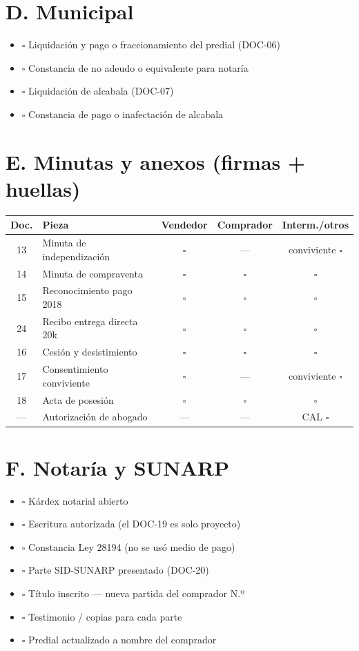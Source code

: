 \documentclass[12pt,a4paper]{article}
\begin{document}
\section*{D. Municipal}
\begin{itemize}[leftmargin=0.9cm]
\item $\square$ Liquidación y pago o fraccionamiento del predial (DOC-06)
\item $\square$ Constancia de no adeudo o equivalente para notaría
\item $\square$ Liquidación de alcabala (DOC-07)
\item $\square$ Constancia de pago o inafectación de alcabala
\end{itemize}

\section*{E. Minutas y anexos (firmas + huellas)}
{\small\renewcommand{\arraystretch}{1.18}
\noindent\begin{tabularx}{\textwidth}{c >{\raggedright\arraybackslash}p{6.8cm} c c c}
\toprule
Doc. & Pieza & Vendedor & Comprador & Interm./otros \\
\midrule
13 & Minuta de independización & $\square$ & --- & conviviente $\square$ \\
14 & Minuta de compraventa & $\square$ & $\square$ & $\square$ \\
15 & Reconocimiento pago 2018 & $\square$ & $\square$ & $\square$ \\
24 & Recibo entrega directa 20k & $\square$ & $\square$ & $\square$ \\
16 & Cesión y desistimiento & $\square$ & $\square$ & $\square$ \\
17 & Consentimiento conviviente & $\square$ & --- & conviviente $\square$ \\
18 & Acta de posesión & $\square$ & $\square$ & $\square$ \\
--- & Autorización de abogado & --- & --- & CAL $\square$ \\
\bottomrule
\end{tabularx}}

\section*{F. Notaría y SUNARP}
\begin{itemize}[leftmargin=0.9cm]
\item $\square$ Kárdex notarial abierto
\item $\square$ Escritura autorizada (el DOC-19 es solo proyecto)
\item $\square$ Constancia Ley 28194 (no se usó medio de pago)
\item $\square$ Parte SID-SUNARP presentado (DOC-20)
\item $\square$ Título inscrito --- nueva partida del comprador N.º\ \linea[4.2cm]
\item $\square$ Testimonio / copias para cada parte
\item $\square$ Predial actualizado a nombre del comprador
\end{itemize}
\end{document}
